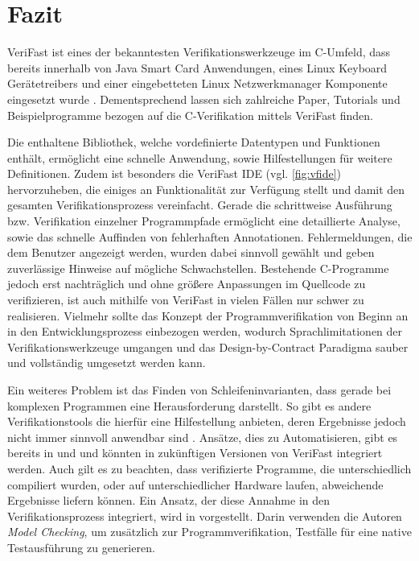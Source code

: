 \section{Fazit}

VeriFast ist eines der bekanntesten Verifikationswerkzeuge im C-Umfeld, dass bereits innerhalb von Java Smart Card Anwendungen, eines Linux Keyboard Gerätetreibers und einer eingebetteten Linux Netzwerkmanager Komponente eingesetzt wurde \cite{Philippaerts2013}. Dementsprechend lassen sich zahlreiche Paper, Tutorials und Beispielprogramme bezogen auf die C-Verifikation mittels VeriFast finden.

Die enthaltene Bibliothek, welche vordefinierte Datentypen und Funktionen enthält, ermöglicht eine schnelle Anwendung, sowie Hilfestellungen für weitere Definitionen. Zudem ist besonders die VeriFast IDE (vgl. \cref{fig:vfide}) hervorzuheben, die einiges an Funktionalität zur Verfügung stellt und damit den gesamten Verifikationsprozess vereinfacht. Gerade die schrittweise Ausführung bzw. Verifikation einzelner Programmpfade ermöglicht eine detaillierte Analyse, sowie das schnelle Auffinden von fehlerhaften Annotationen. Fehlermeldungen, die dem Benutzer angezeigt werden, wurden dabei sinnvoll gewählt und geben zuverlässige Hinweise auf mögliche Schwachstellen. Bestehende C-Programme jedoch erst nachträglich und ohne größere Anpassungen im Quellcode zu verifizieren, ist auch mithilfe von VeriFast in vielen Fällen nur schwer zu realisieren. Vielmehr sollte das Konzept der Programmverifikation von Beginn an in den Entwicklungsprozess einbezogen werden, wodurch Sprachlimitationen der Verifikationswerkzeuge umgangen und das Design-by-Contract Paradigma sauber und vollständig umgesetzt werden kann.

Ein weiteres Problem ist das Finden von Schleifeninvarianten, dass gerade bei komplexen Programmen eine Herausforderung darstellt. So gibt es andere Verifikationstools die hierfür eine Hilfestellung anbieten, deren Ergebnisse jedoch nicht immer sinnvoll anwendbar sind \cite{Crocker2007}. Ansätze, dies zu Automatisieren, gibt es bereits in \cite{Stark1990} und \cite{Leino2005} und könnten in zukünftigen Versionen von VeriFast integriert werden. Auch gilt es zu beachten, dass verifizierte Programme, die unterschiedlich compiliert wurden, oder auf unterschiedlicher Hardware laufen, abweichende Ergebnisse liefern können. Ein Ansatz, der diese Annahme in den Verifikationsprozess integriert, wird in \cite{Kandl2007} vorgestellt. Darin verwenden die Autoren \emph{Model Checking}, um zusätzlich zur Programmverifikation, Testfälle für eine native Testausführung zu generieren.